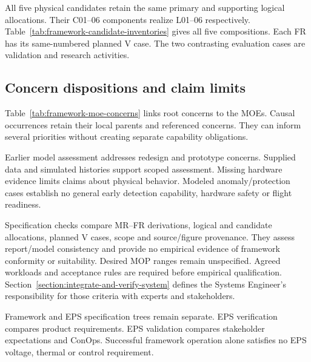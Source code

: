 All five physical candidates retain the same primary and supporting logical allocations. Their C01--06 components realize L01--06 respectively. Table~\ref{tab:framework-candidate-inventories} gives all five compositions. Each FR has its same-numbered planned V case. The two contrasting evaluation cases are validation and research activities.

\subsection{Concern dispositions and claim limits}

Table~\ref{tab:framework-moe-concerns} links root concerns to the MOEs. Causal occurrences retain their local parents and referenced concerns. They can inform several priorities without creating separate capability obligations.

Earlier model assessment addresses redesign and prototype concerns. Supplied data and simulated histories support scoped assessment. Missing hardware evidence limits claims about physical behavior. Modeled anomaly/protection cases establish no general early detection capability, hardware safety or flight readiness.

Specification checks compare MR--FR derivations, logical and candidate allocations, planned V cases, scope and source/figure provenance. They assess report/model consistency and provide no empirical evidence of framework conformity or suitability. Desired MOP ranges remain unspecified. Agreed workloads and acceptance rules are required before empirical qualification. Section~\ref{section:integrate-and-verify-system} defines the Systems Engineer's responsibility for those criteria with experts and stakeholders.

Framework and EPS specification trees remain separate. EPS verification compares product requirements. EPS validation compares stakeholder expectations and ConOps. Successful framework operation alone satisfies no EPS voltage, thermal or control requirement.
